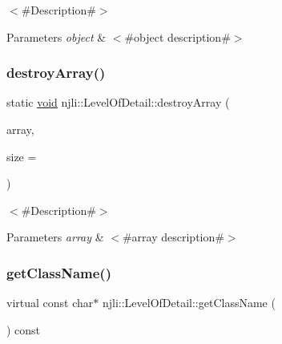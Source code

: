 $<$\#\+Description\#$>$


\begin{DoxyParams}{Parameters}
{\em object} & $<$\#object description\#$>$ \\
\hline
\end{DoxyParams}
\mbox{\label{classnjli_1_1_level_of_detail_a578947ba5dbc024131ae8fc2e5a8ae36}} 
\subsubsection{\texorpdfstring{destroy\+Array()}{destroyArray()}}
{\footnotesize\ttfamily static \mbox{\hyperlink{_thread_8h_af1e856da2e658414cb2456cb6f7ebc66}{void}} njli\+::\+Level\+Of\+Detail\+::destroy\+Array (\begin{DoxyParamCaption}\item[{\mbox{\hyperlink{classnjli_1_1_level_of_detail}{Level\+Of\+Detail}} $\ast$$\ast$}]{array,  }\item[{const \mbox{\hyperlink{_util_8h_a10e94b422ef0c20dcdec20d31a1f5049}{u32}}}]{size = {} }\end{DoxyParamCaption})\hspace{0.3cm}{\ttfamily [static]}}

$<$\#\+Description\#$>$


\begin{DoxyParams}{Parameters}
{\em array} & $<$\#array description\#$>$ \\
\hline
\end{DoxyParams}
\mbox{\label{classnjli_1_1_level_of_detail_adf0fe87798b3a638e503073cf348e720}} 
\subsubsection{\texorpdfstring{get\+Class\+Name()}{getClassName()}}
{\footnotesize\ttfamily virtual const char$\ast$ njli\+::\+Level\+Of\+Detail\+::get\+Class\+Name (\begin{DoxyParamCaption}{ }\end{DoxyParamCaption}) const\hspace{0.3cm}{\ttfamily [virtual]}}

